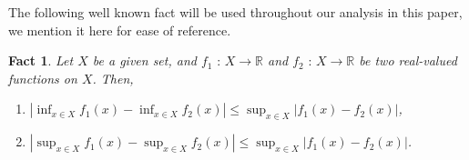 \documentclass[12pt,technote,onecolumn]{IEEEtran}
\newtheorem{fact}{Fact}
\begin{document}
%






\newpage
\appendix  %

%

The following well known fact will be used throughout our analysis
in this paper, we mention it here for ease of reference.
\begin{fact}
	\label{Fact} Let $X$ be a given set, and $f_{1}\mbox{ : }X\rightarrow\mathbb{R}$
	and $f_{2}\mbox{ : }X\rightarrow\mathbb{R}$ be two real-valued functions
	on $X$. Then,
	\begin{enumerate}
		\item $|\inf_{x\in X}f_{1}\left(x\right)-\inf_{x\in X}f_{2}\left(x\right)|\leq\sup_{x\in X}|f_{1}\left(x\right)-f_{2}\left(x\right)|$,
		\item $|\sup_{x\in X}f_{1}\left(x\right)-\sup_{x\in X}f_{2}\left(x\right)|\leq\sup_{x\in X}|f_{1}\left(x\right)-f_{2}\left(x\right)|$.
	\end{enumerate}
\end{fact}
\end{document}

